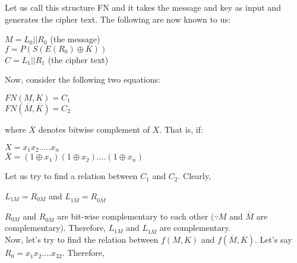 \documentclass[11pt]{article}
\begin{document}
\begin{center}
\end{center}
Let us call this structure FN and it takes the message and key as input and generates the cipher text. The following are now known to us:
\begin{center}
    $M = L_0 || R_0$ (the message)\\
    $f = P(S(E(R_0) \oplus K))$ \\
    $C = L_1 || R_1$ (the cipher text)
\end{center}
Now, consider the following two equations:
\begin{center}
    $FN(M, K) = C_1$\\
    $FN(\overline{M}, \overline{K}) = C_2$\\
\end{center}
where $\overline{X}$ denotes bitwise complement of $X$. That is, if:
\begin{center}
    $X = x_1x_2.....x_n$\\
    $\overline{X} = (1\oplus x_1)(1 \oplus x_2)....(1 \oplus x_n)$
\end{center}
Let us try to find a relation between $C_1$ and $C_2$. Clearly,
\begin{center}
    $L_{1M} = R_{0M}$ and $L_{1\overline{M}} = R_{0\overline{M}}$\\
\end{center}
$R_{0M}$ and $R_{0\overline{M}}$ are bit-wise complementary to each other $(\because M$ and $\overline{M}$ are complementary). Therefore, $L_{1M}$ and $L_{1\overline{M}}$ are complementary.\\
\newline
Now, let's try to find the relation between $f(M, K)$ and $f(\overline{M}, \overline{K})$. Let's say $R_0 = x_1x_2....x_{32}$. Therefore,
\end{document}
